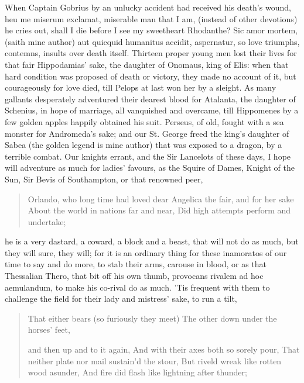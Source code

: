 When Captain Gobrius by an unlucky accident had received his
death's wound, heu me miserum exclamat, miserable man that I am,
(instead of other devotions) he cries out, shall I die before I see my
sweetheart Rhodanthe? Sic amor mortem, (saith mine author) aut quicquid
humanitus accidit, aspernatur, so love triumphs, contemns, insults over
death itself. Thirteen proper young men lost their lives for that fair
Hippodamias' sake, the daughter of Onomaus, king of Elis: when that
hard condition was proposed of death or victory, they made no account
of it, but courageously for love died, till Pelops at last won her by a
sleight. As many gallants desperately adventured their dearest
blood for Atalanta, the daughter of Schenius, in hope of marriage, all
vanquished and overcame, till Hippomenes by a few golden apples happily
obtained his suit. Perseus, of old, fought with a sea monster for
Andromeda's sake; and our St. George freed the king's daughter of Sabea
(the golden legend is mine author) that was exposed to a dragon, by a
terrible combat. Our knights errant, and the Sir Lancelots of these
days, I hope will adventure as much for ladies' favours, as the Squire
of Dames, Knight of the Sun, Sir Bevis of Southampton, or that renowned
peer,

\begin{verse}%
Orlando, who long time had loved dear
Angelica the fair, and for her sake
About the world in nations far and near,
Did high attempts perform and undertake;
\end{verse}%

he is a very dastard, a coward, a block and a beast, that will not do
as much, but they will sure, they will; for it is an ordinary thing for
these inamoratos of our time to say and do more, to stab their arms,
carouse in blood, or as that Thessalian Thero, that bit off his
own thumb, provocans rivalem ad hoc aemulandum, to make his co-rival do
as much. 'Tis frequent with them to challenge the field for their lady
and mistress' sake, to run a tilt,

\begin{verse}%
That either bears (so furiously they meet)
The other down under the horses' feet,

and then up and to it again,
And with their axes both so sorely pour,
That neither plate nor mail sustain'd the stour,
But riveld wreak like rotten wood asunder,
And fire did flash like lightning after thunder;
\end{verse}%

